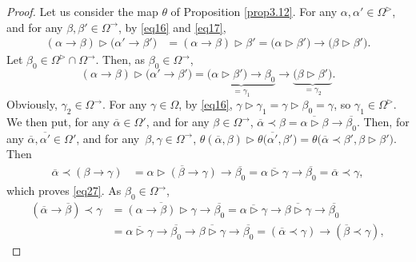 \documentclass[pdftex]{sigma}
\numberwithin{equation}{section}
\begin{document}
\begin{proof}
Let us consider the map $\theta$ of Proposition \ref{prop3.12}. For any $\alpha,\alpha'\in \Omega^\triangleright$, and for any $\beta,\beta'\in \Omega^\rightarrow$, by \eqref{eq16} and \eqref{eq17},
\begin{align*}
(\alpha \rightarrow \beta) \triangleright \bigl(\alpha'\rightarrow \beta'\bigr)&=(\alpha \rightarrow \beta)\triangleright \beta'=\bigl(\alpha \triangleright \beta'\bigr)\rightarrow \bigl(\beta \triangleright \beta'\bigr).
\end{align*}
Let $\beta_0\in \Omega^\triangleright \cap \Omega^\rightarrow$. Then, as $\beta_0\in \Omega^\rightarrow$,
\[(\alpha \rightarrow \beta) \triangleright \bigl(\alpha'\rightarrow \beta'\bigr)=\underbrace{\bigl(\alpha \triangleright \beta'\bigr)\rightarrow \beta_0}_{=\gamma_1}\rightarrow\underbrace{\bigl(\beta \triangleright \beta'\bigr)}_{=\gamma_2}.\]
Obviously, $\gamma_2\in \Omega^\rightarrow$. For any $\gamma \in \Omega$, by \eqref{eq16},
$\gamma \triangleright \gamma_1=\gamma \triangleright \beta_0=\gamma$,
so $\gamma_1\in \Omega^\triangleright$. We then put, for any $\overline{\alpha}\in \Omega'$, and for any $\beta\in \Omega^\rightarrow$,
$\overline{\alpha}\prec \beta=\overline{\alpha\triangleright \beta}\rightarrow \overline{\beta_0}$.
Then, for any $\overline{\alpha}, \overline{\alpha'}\in \Omega'$, and for any~${\beta,\gamma \in \Omega^\rightarrow}$,
$\theta(\overline{\alpha},\beta)\triangleright \theta\bigl(\overline{\alpha'},\beta'\bigr)=\theta\bigl(\overline{\alpha}\prec \beta',\beta \triangleright \beta'\bigr)$.
Then
\begin{align*}
\overline{\alpha}\prec(\beta \rightarrow \gamma)&=\overline{\alpha \triangleright(\beta \rightarrow \gamma)}\rightarrow \overline{\beta_0}=\overline{\alpha \triangleright \gamma}\rightarrow \overline{\beta_0}=\overline{\alpha}\prec \gamma,
\end{align*}
which proves \eqref{eq27}. As $\beta_0\in \Omega^\rightarrow$,
\begin{align*}
(\overline{\alpha}\rightarrow \overline{\beta})\prec \gamma&=\overline{(\alpha \rightarrow \beta) \triangleright \gamma}\rightarrow \overline{\beta_0}=\overline{\alpha \triangleright \gamma}\rightarrow\overline{\beta \triangleright \gamma}\rightarrow \overline{\beta_0}\\
&=\overline{\alpha \triangleright \gamma}\rightarrow \overline{\beta_0}\rightarrow\overline{\beta \triangleright \gamma}\rightarrow \overline{\beta_0}=(\overline{\alpha}\prec \gamma)\rightarrow (\overline{\beta}\prec \gamma),

\end{align*}
\end{proof}
\end{document}

